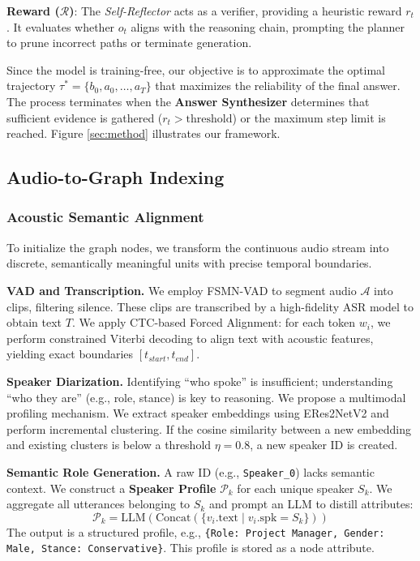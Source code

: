 \documentclass[11pt]{article}
\begin{document}
\textbf{Reward ($\mathcal{R}$)}: The \textit{Self-Reflector} acts as a verifier, providing a heuristic reward $r_t$. It evaluates whether $o_t$ aligns with the reasoning chain, prompting the planner to prune incorrect paths or terminate generation.

Since the model is training-free, our objective is to approximate the optimal trajectory $\tau^* = \{b_0, a_0, \dots, a_T\}$ that maximizes the reliability of the final answer. The process terminates when the \textbf{Answer Synthesizer} determines that sufficient evidence is gathered ($r_t > \text{threshold}$) or the maximum step limit is reached. Figure \ref{sec:method} illustrates our framework.

\subsection{Audio-to-Graph Indexing}

\subsubsection{Acoustic Semantic Alignment}
To initialize the graph nodes, we transform the continuous audio stream into discrete, semantically meaningful units with precise temporal boundaries.

\textbf{VAD and Transcription.} We employ FSMN-VAD to segment audio $\mathcal{A}$ into clips, filtering silence. These clips are transcribed by a high-fidelity ASR model to obtain text $T$. We apply CTC-based Forced Alignment: for each token $w_i$, we perform constrained Viterbi decoding to align text with acoustic features, yielding exact boundaries $[t_{start}, t_{end}]$. 

\textbf{Speaker Diarization.}
Identifying ``who spoke'' is insufficient; understanding ``who they are'' (e.g., role, stance) is key to reasoning. We propose a multimodal profiling mechanism.
We extract speaker embeddings using ERes2NetV2 and perform incremental clustering. If the cosine similarity between a new embedding and existing clusters is below a threshold $\eta=0.8$, a new speaker ID is created.

\textbf{Semantic Role Generation.} 
A raw ID (e.g., \texttt{Speaker\_0}) lacks semantic context. We construct a \textbf{Speaker Profile} $\mathcal{P}_k$ for each unique speaker $S_k$. We aggregate all utterances belonging to $S_k$ and prompt an LLM to distill attributes:
\begin{equation}
    \mathcal{P}_k = \text{LLM}(\text{Concat}(\{v_i.\text{text} \mid v_i.\text{spk} = S_k\}))
\end{equation}
The output is a structured profile, e.g., \texttt{\{Role: Project Manager, Gender: Male, Stance: Conservative\}}. This profile is stored as a node attribute.
\end{document}
